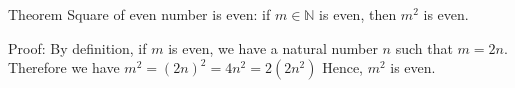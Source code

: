 Theorem Square of even number is even: 
if $m \in \mathbb{N}$ is even, then $m^2$ is even.


Proof:
By definition, if $m$ is even, we have a natural number $n$ such that $m = 2n$.
Therefore we have $m^2 = (2n)^2 = 4n^2 = 2(2n^2)$
Hence, $m^2$ is even.